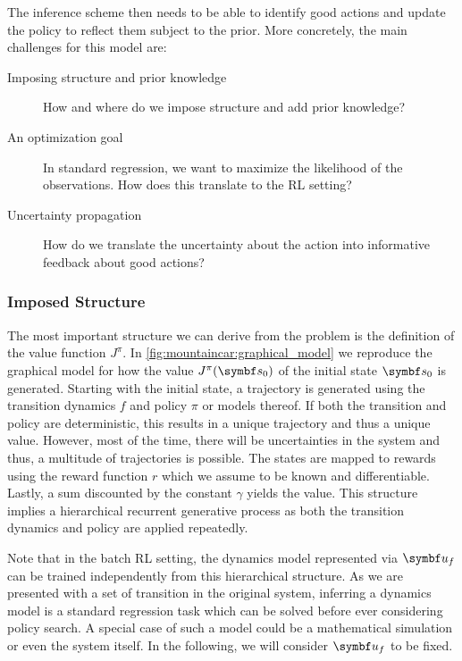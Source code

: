 The inference scheme then needs to be able to identify good actions and update the policy to reflect them subject to the prior.
More concretely, the main challenges for this model are:
\begin{description}
    \item[Imposing structure and prior knowledge] How and where do we impose structure and add prior knowledge?
    \item[An optimization goal] In standard regression, we want to maximize the likelihood of the observations. How does this translate to the RL setting?
    \item[Uncertainty propagation] How do we translate the uncertainty about the action into informative feedback about good actions?
\end{description}


\subsubsection{Imposed Structure}
The most important structure we can derive from the problem is the definition of the value function $J^\pi$.
In \cref{fig:mountaincar:graphical_model} we reproduce the graphical model for how the value $J^\pi(\mat{s}_0)$ of the initial state $\mat{s}_0$ is generated.
Starting with the initial state, a trajectory is generated using the transition dynamics $f$ and policy $\pi$ or models thereof.
If both the transition and policy are deterministic, this results in a unique trajectory and thus a unique value.
However, most of the time, there will be uncertainties in the system and thus, a multitude of trajectories is possible.
The states are mapped to rewards using the reward function $r$ which we assume to be known and differentiable.
Lastly, a sum discounted by the constant $\gamma$ yields the value.
This structure implies a hierarchical recurrent generative process as both the transition dynamics and policy are applied repeatedly.

Note that in the batch RL setting, the dynamics model represented via $\mat{u}_f$ can be trained independently from this hierarchical structure.
As we are presented with a set of transition in the original system, inferring a dynamics model is a standard regression task which can be solved before ever considering policy search.
A special case of such a model could be a mathematical simulation or even the system itself.
In the following, we will consider $\mat{u}_f$ to be fixed.

